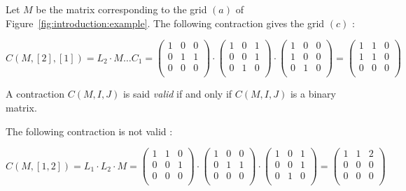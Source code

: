 \begin{example}
	Let $M$ be the matrix corresponding to the grid $(a)$ of Figure~\ref{fig:introduction:example}. The following contraction gives the grid $(c)$ :
	
	$$
	C(M,[2],[1]) = L_2 \cdot M \dots C_1 = \begin{pmatrix}
	1 & 0 & 0 \\
	0 & 1 & 1 \\
	0 & 0 & 0 \\
	\end{pmatrix} \cdot \begin{pmatrix}
	1 & 0 & 1 \\
	0 & 0 & 1 \\
	0 & 1 & 0 \\
	\end{pmatrix} \cdot \begin{pmatrix}
	1 & 0 & 0 \\
	1 & 0 & 0 \\
	0 & 1 & 0 \\
	\end{pmatrix} = \begin{pmatrix}
	1 & 1 & 0 \\
	1 & 1 & 0 \\
	0 & 0 & 0 \\
	\end{pmatrix}
	$$
\end{example}

\begin{definition}
	A contraction $C(M,I,J)$ is said \emph{valid} if and only if $C(M,I,J)$ is a binary matrix.
\end{definition}

\begin{example}
	The following contraction is not valid :
	
	$$
	C(M,[1,2]) = L_1 \cdot L_2 \cdot M = \begin{pmatrix}
	1 & 1 & 0 \\
	0 & 0 & 1 \\
	0 & 0 & 0 \\
	\end{pmatrix} \cdot \begin{pmatrix}
	1 & 0 & 0 \\
	0 & 1 & 1 \\
	0 & 0 & 0 \\
	\end{pmatrix} \cdot\begin{pmatrix}
	1 & 0 & 1 \\
	0 & 0 & 1 \\
	0 & 1 & 0 \\
	\end{pmatrix}  = \begin{pmatrix}
	1 & 1 & 2 \\
	0 & 0 & 0 \\
	0 & 0 & 0 \\
	\end{pmatrix}
	$$
\end{example}

